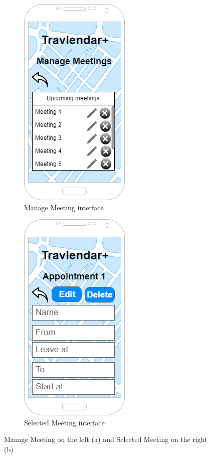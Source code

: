 \begin{figure}[h]
\centering
\begin{subfigure}{.5\textwidth}
  \centering
  \includegraphics[height=.4\textheight, keepaspectratio=true]{Img/ManageMeeting}
  \caption{Manage Meeting interface}
\end{subfigure}%
\begin{subfigure}{.5\textwidth}
  \centering
  \includegraphics[height=.4\textheight, keepaspectratio=true]{Img/SelectedMeeting}
  \caption{Selected Meeting interface}
\end{subfigure}
\caption{Manage Meeting on the left (a) and Selected Meeting on the right (b)}
\end{figure}

